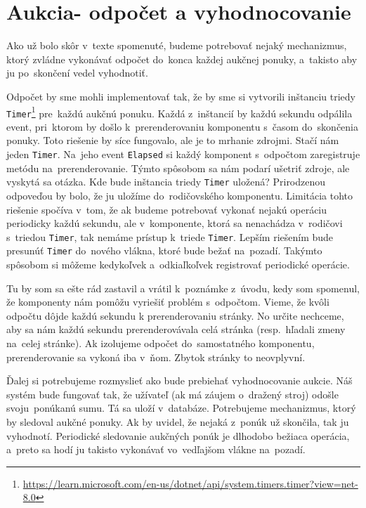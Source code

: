 \section{Aukcia- odpočet a vyhodnocovanie}

Ako už bolo skôr v~texte spomenuté, budeme potrebovať nejaký mechanizmus, ktorý zvládne vykonávať odpočet do~konca každej aukčnej ponuky, a~takisto aby ju po~skončení vedel vyhodnotiť.

Odpočet by sme mohli implementovať tak, že by sme si vytvorili inštanciu triedy \verb|Timer|\footnote{\url{https://learn.microsoft.com/en-us/dotnet/api/system.timers.timer?view=net-8.0}} pre~každú aukčnú ponuku. Každá z~inštancií by každú sekundu odpálila event, pri~ktorom by došlo k~prerenderovaniu komponentu s~časom do~skončenia ponuky. Toto riešenie by síce fungovalo, ale je to mrhanie zdrojmi. Stačí nám jeden \verb|Timer|. Na~jeho event \verb|Elapsed| si každý komponent s~odpočtom zaregistruje metódu na~prerenderovanie. Týmto spôsobom sa nám podarí ušetriť zdroje, ale vyskytá sa otázka. Kde bude inštancia triedy \verb|Timer| uložená? Prirodzenou odpoveďou by bolo, že ju uložíme do~rodičovského komponentu. Limitácia tohto riešenie spočíva v~tom, že ak budeme potrebovať vykonať nejakú operáciu periodicky každú sekundu, ale v~komponente, ktorá sa nenachádza v~rodičovi s~triedou \verb|Timer|, tak nemáme prístup k~triede \verb|Timer|. Lepším riešením bude presunúť \verb|Timer| do~nového vlákna, ktoré bude bežať na~pozadí. Takýmto spôsobom si môžeme kedykoľvek a~odkiaľkoľvek registrovať periodické operácie.

Tu by som sa ešte rád zastavil a vrátil k~poznámke z~úvodu, kedy som spomenul, že komponenty nám pomôžu vyriešiť problém s~odpočtom. Vieme, že kvôli odpočtu dôjde každú sekundu k prerenderovaniu stránky. No určite nechceme, aby sa nám každú sekundu prerenderovávala celá stránka (resp.~hľadali zmeny na~celej stránke). Ak izolujeme odpočet do~samostatného komponentu, prerenderovanie sa vykoná iba v~ňom. Zbytok stránky to neovplyvní.

Ďalej si potrebujeme rozmyslieť ako bude prebiehať vyhodnocovanie aukcie. Náš systém bude fungovať tak, že užívateľ (ak má záujem o~dražený stroj) odošle svoju~ponúkanú sumu. Tá sa uloží v~databáze. Potrebujeme mechanizmus, ktorý by sledoval aukčné ponuky. Ak by uvidel, že nejaká z~ponúk už skončila, tak ju vyhodnotí. Periodické sledovanie aukčných ponúk je dlhodobo bežiaca operácia, a~preto sa hodí ju takisto vykonávať vo~vedľajšom vlákne na~pozadí.

